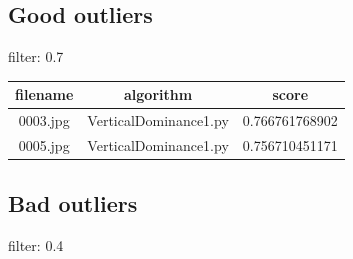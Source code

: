 \documentclass[a4paper,10pt]{article}
\begin{document}
\subsection*{Good outliers}
filter: 0.7
 
				\begin{table}[htbp]
				\centering
				\begin{tabular}{|c|c|c|}
				\hline
				filename&algorithm&score\\
				\hline
				0003.jpg&VerticalDominance1.py&0.766761768902\\
0005.jpg&VerticalDominance1.py&0.756710451171\\

				\hline
				\end{tabular}
				\end{table}
				 
\subsection*{Bad outliers}
filter: 0.4
 
\end{document}
